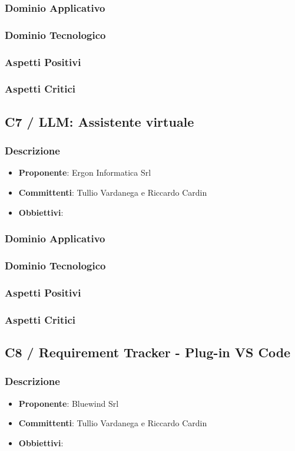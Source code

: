 \documentclass[a4paper, 12pt]{article}
\begin{document}
\subsubsection{Dominio Applicativo}
\subsubsection{Dominio Tecnologico}
\subsubsection{Aspetti Positivi}
\subsubsection{Aspetti Critici}
\subsection{C7 / LLM: Assistente virtuale}
\subsubsection{Descrizione}
\begin{itemize}
    \item \textbf{Proponente}: Ergon Informatica Srl
    \item \textbf{Committenti}: Tullio Vardanega e Riccardo Cardin
    \item \textbf{Obbiettivi}: 
\end{itemize}
\subsubsection{Dominio Applicativo}
\subsubsection{Dominio Tecnologico}
\subsubsection{Aspetti Positivi}
\subsubsection{Aspetti Critici}
\subsection{C8 / Requirement Tracker - Plug-in VS Code}
\subsubsection{Descrizione}
\begin{itemize}
    \item \textbf{Proponente}: Bluewind Srl
    \item \textbf{Committenti}: Tullio Vardanega e Riccardo Cardin
    \item \textbf{Obbiettivi}: 
\end{itemize}
\end{document}
